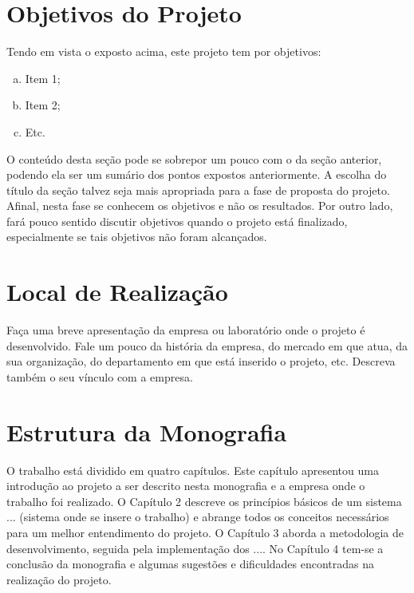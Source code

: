 \section{Objetivos do Projeto}
\label{sec:objetivos}

Tendo em vista o exposto acima, este projeto tem por objetivos:

\begin{enumerate}[a)]
\item Item 1;
\item Item 2; 
\item Etc.     
\end{enumerate}

O conteúdo desta seção pode se sobrepor um pouco com o da seção anterior, podendo ela ser um sumário dos pontos expostos anteriormente. A escolha do título da seção talvez seja mais apropriada para a fase de proposta do projeto. Afinal, nesta fase se conhecem os objetivos e não os resultados. Por outro lado, fará pouco sentido discutir objetivos quando o projeto está finalizado, especialmente se tais objetivos não foram alcançados. 


\section{Local de Realização}
\label{sec:empresa}

Faça uma breve apresentação da empresa ou laboratório onde o projeto é desenvolvido. Fale um pouco da história da empresa, do mercado em que atua, da sua organização, do departamento em que está inserido o projeto, etc. Descreva também o seu vínculo com a empresa. 


\section{Estrutura da Monografia}
\label{sec:organizacao}

O trabalho está dividido em quatro capítulos. Este capítulo apresentou uma introdução ao projeto a ser descrito nesta monografia e a empresa onde o trabalho foi realizado. O Capítulo 2 descreve os princípios básicos de um sistema ... (sistema onde se insere o trabalho) e abrange todos os conceitos necessários para um melhor entendimento do projeto. O Capítulo 3 aborda a metodologia de desenvolvimento, seguida pela implementação dos .... No Capítulo 4 tem-se a conclusão da  monografia e algumas sugestões e dificuldades encontradas na realização do projeto.


\clearpage